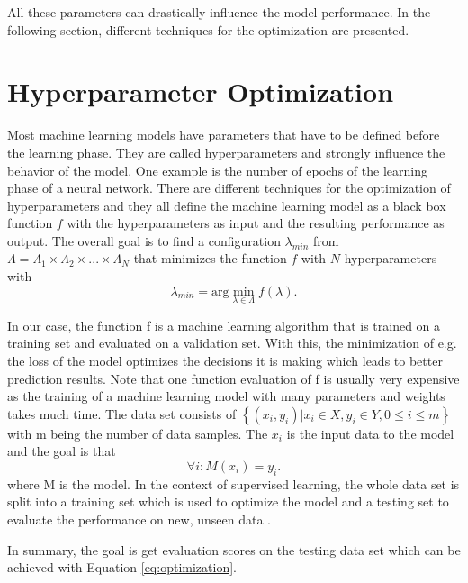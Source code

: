 All these parameters can drastically influence the model performance. In the following section, different techniques for the optimization are presented.


\section{Hyperparameter Optimization}\label{sec:hyperparameter_optimization}

Most machine learning models have parameters that have to be defined before the learning phase. They are called hyperparameters and strongly influence the behavior of the model. One example is the number of epochs of the learning phase of a neural network. There are different techniques for the optimization of hyperparameters and they all define the machine learning model as a black box function $ f $ with the hyperparameters as input and the resulting performance as output. The overall goal is to find a configuration $ \lambda_{min} $ from $ \Lambda = \Lambda_1 \times \Lambda_2 \times ... \times \Lambda_N $ that minimizes the function $ f $ with $ N $ hyperparameters with 
\begin{equation}
	\label{eq:optimization}
	\lambda_{min} = \text{arg} \min_{\lambda \in \Lambda} f(\lambda) .
\end{equation}

In our case, the function f is a machine learning algorithm that is trained on a training set and evaluated on a validation set. With this, the minimization of e.g. the loss of the model optimizes the decisions it is making which leads to better prediction results. Note that one function evaluation of f is usually very expensive as the training of a machine learning model with many parameters and weights takes much time. The data set consists of $ \left\{ (x_i, y_i) | x_i \in X, y_i \in Y, 0 \le i \le m \right\} $ with m being the number of data samples. The $ x_i $ is the input data to the model and the goal is that 
\begin{equation}
	\forall i: M(x_i) = y_i.
\end{equation}
where M is the model. In the context of supervised learning, the whole data set is split into a training set which is used to optimize the model and a testing set to evaluate the performance on new, unseen data \cite{supervised_learning}.

In summary, the goal is get evaluation scores on the testing data set which can be achieved with Equation \ref{eq:optimization}. 
\cite{feurer2019hyperparameter,bischl2021hyperparameter,yang2020hyperparameter}

